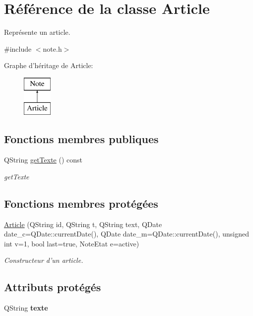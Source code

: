 \hypertarget{class_article}{\section{Référence de la classe Article}
\label{class_article}
}


Représente un article.  




{\ttfamily \#include $<$note.\-h$>$}

Graphe d'héritage de Article\-:\begin{figure}[H]
\begin{center}
\leavevmode
\includegraphics[height=2.000000cm]{class_article}
\end{center}
\end{figure}
\subsection*{Fonctions membres publiques}
\begin{DoxyCompactItemize}
\item 
Q\-String \hyperlink{class_article_a5aca02545dd453381abba632d7e05402}{get\-Texte} () const 
\begin{DoxyCompactList}\small\item\em get\-Texte \end{DoxyCompactList}\end{DoxyCompactItemize}
\subsection*{Fonctions membres protégées}
\begin{DoxyCompactItemize}
\item 
\hyperlink{class_article_ac7e17d78ceb14b64c0781a5caa83ef0a}{Article} (Q\-String id, Q\-String t, Q\-String text, Q\-Date date\-\_\-c=Q\-Date\-::current\-Date(), Q\-Date date\-\_\-m=Q\-Date\-::current\-Date(), unsigned int v=1, bool last=true, Note\-Etat e=active)
\begin{DoxyCompactList}\small\item\em Constructeur d'un article. \end{DoxyCompactList}\end{DoxyCompactItemize}
\subsection*{Attributs protégés}
\begin{DoxyCompactItemize}
\item 
\hypertarget{class_article_ab75a1cc11324d419d62e3114a462d31d}{Q\-String {\bfseries texte}}\label{class_article_ab75a1cc11324d419d62e3114a462d31d}

\end{DoxyCompactItemize}
